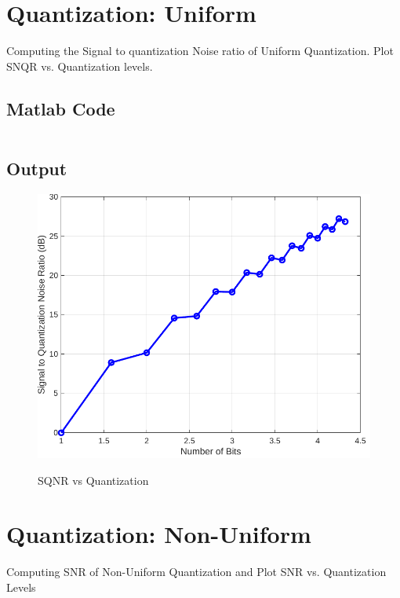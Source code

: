 \section{Quantization: Uniform}
\label{sec:Quantization: Uniform}

Computing the Signal to quantization Noise ratio of Uniform Quantization. 
Plot SNQR vs. Quantization levels.

\subsection{Matlab Code}

\inputminted[fontsize=\footnotesize,autogobble]{matlab}{code/sqnr.m}

\pagebreak

\subsection{Output}

\begin{figure}[!htb]
	\centering
	\includegraphics[width=6in]{res/figures/Figure_3.pdf}
	\label{output:SQNR vs quantization}
	\caption{SQNR vs Quantization}
\end{figure}

\section{Quantization: Non-Uniform}
\label{sec:Quantization: Non-Uniform}

Computing SNR of Non-Uniform Quantization and Plot SNR vs. Quantization Levels

